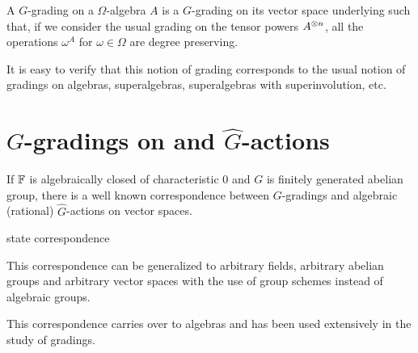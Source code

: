 \begin{defi}
    A $G$-grading on a $\Omega$-algebra $A$ is a $G$-grading on its vector space underlying such that, if we consider the usual grading on the tensor powers $A^{\otimes n}$, all the operations $\omega^A$ for $\omega \in \Omega$ are degree preserving.
\end{defi}

It is easy to verify that this notion of grading corresponds to the usual notion of gradings on algebras, superalgebras, superalgebras with superinvolution, etc.



\section{$G$-gradings on  and $\widehat G$-actions}

If $\mathbb{F}$ is algebraically closed of characteristic $0$ and $G$ is finitely generated abelian group, there is a well known correspondence between $G$-gradings and algebraic (rational) $\widehat G$-actions on vector spaces. 

\begin{thm}
    state correspondence
\end{thm}

\begin{rmk}
    This correspondence can be generalized to arbitrary fields, arbitrary abelian groups and arbitrary vector spaces with the use of group schemes instead of algebraic groups.
\end{rmk}

This correspondence carries over to algebras and has been used extensively in the study of gradings.

